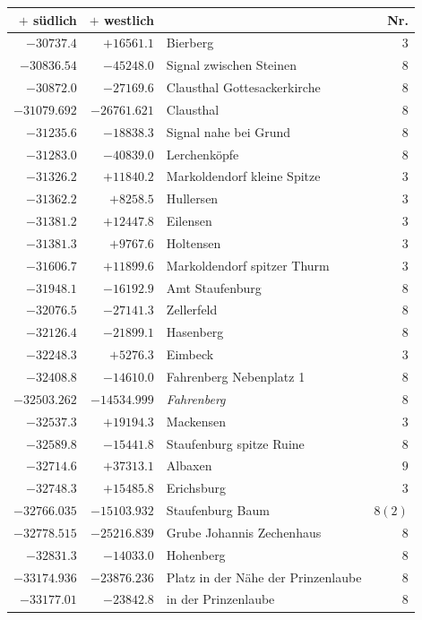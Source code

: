 \begin{center}\begingroup\fontsize{8}{9}\selectfont
\setlength{\tabcolsep}{4pt}
\begin{tabular}{r|r|p{170pt}|r}\hline
\(+\) südlich&\(+\) westlich&&Nr.\\\hline
\(-30737.4\)&\(+16561.1\)&Bierberg&\(3\)\\
\(-30836.54\)&\(-45248.0\)&Signal zwischen Steinen&\(8\)\\
\(-30872.0\)&\(-27169.6\)&Clausthal Gottesackerkirche&\(8\)\\
\(-31079.692\)&\(-26761.621\)&Clausthal&\(8\)\\
\(-31235.6\)&\(-18838.3\)&Signal nahe bei Grund&\(8\)\\
\(-31283.0\)&\(-40839.0\)&Lerchenköpfe&\(8\)\\
\(-31326.2\)&\(+11840.2\)&Markoldendorf kleine Spitze&\(3\)\\
\(-31362.2\)&\(+8258.5\)&Hullersen&\(3\)\\
\(-31381.2\)&\(+12447.8\)&Eilensen&\(3\)\\
\(-31381.3\)&\(+9767.6\)&Holtensen&\(3\)\\
\(-31606.7\)&\(+11899.6\)&Markoldendorf spitzer Thurm&\(3\)\\
\(-31948.1\)&\(-16192.9\)&Amt Staufenburg&\(8\)\\
\(-32076.5\)&\(-27141.3\)&Zellerfeld&\(8\)\\
\(-32126.4\)&\(-21899.1\)&Hasenberg&\(8\)\\
\(-32248.3\)&\(+5276.3\)&Eimbeck&\(3\)\\
\(-32408.8\)&\(-14610.0\)&Fahrenberg Nebenplatz 1&\(8\)\\
\(-32503.262\)&\(-14534.999\)&\textit{Fahrenberg}&\(8\)\\
\(-32537.3\)&\(+19194.3\)&Mackensen&\(3\)\\
\(-32589.8\)&\(-15441.8\)&Staufenburg spitze Ruine&\(8\)\\
\(-32714.6\)&\(+37313.1\)&Albaxen&\(9\)\\
\(-32748.3\)&\(+15485.8\)&Erichsburg&\(3\)\\
\(-32766.035\)&\(-15103.932\)&Staufenburg Baum&\(8 (2)\)\\
\(-32778.515\)&\(-25216.839\)&Grube Johannis Zechenhaus&\(8\)\\
\(-32831.3\)&\(-14033.0\)&Hohenberg&\(8\)\\
\(-33174.936\)&\(-23876.236\)&Platz in der Nähe der Prinzenlaube&\(8\)\\
\(-33177.01\)&\(-23842.8\)&in der Prinzenlaube&\(8\)\\

\end{tabular}
\end{center}
